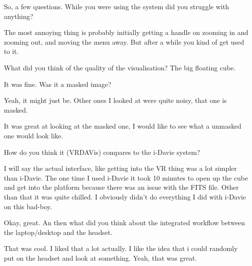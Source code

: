 \begin{description}
    \mich So, a few questions. While you were using the system did you struggle with anything?
    
    \nabeelah The most annoying thing is probably initially getting a handle on zooming in and zooming out, and moving the menu away. But after a while you kind of get used to it.
    
    \mich What did you think of the quality of the visualisation? The big floating cube.
    
    \nabeelah It was fine. Was it a masked image?
    
    \mich Yeah, it might just be. Other ones I looked at were quite noisy, that one is masked.
    
    \nabeelah It was great at looking at the masked one, I would like to see what a unmasked one would look like.
    
    \mich How do you think it (VRDAVis) compares to the i-Davie system?
    
    \nabeelah I will say the actual interface, like getting into the VR thing was a lot simpler than i-Davie. The one time I used i-Davie it took 10 minutes to open up the cube and get into the platform because there was an issue with the FITS file. Other than that it was quite chilled. I obviously didn't do everything I did with i-Davie on this bad-boy.
    
    \mich Okay, great. An then what did you think about the integrated workflow between the laptop/desktop and the headset.
    
    \nabeelah That was cool. I liked that a lot actually. I like the idea that i could randomly put on the headset and look at something. Yeah, that was great.
\end{description}